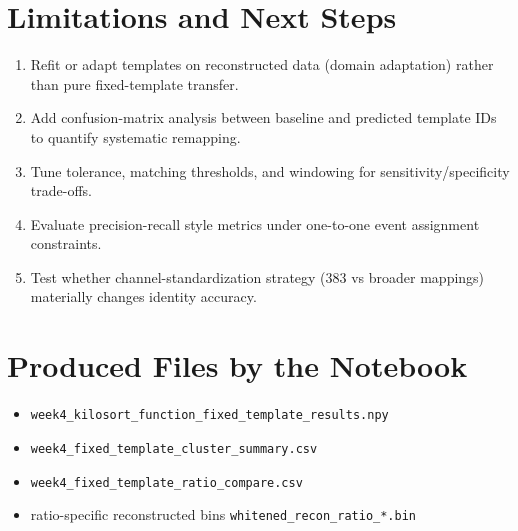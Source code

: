 ﻿\documentclass[11pt]{article}
\begin{document}
\section{Limitations and Next Steps}
\begin{enumerate}
  \item Refit or adapt templates on reconstructed data (domain adaptation) rather than pure fixed-template transfer.
  \item Add confusion-matrix analysis between baseline and predicted template IDs to quantify systematic remapping.
  \item Tune tolerance, matching thresholds, and windowing for sensitivity/specificity trade-offs.
  \item Evaluate precision-recall style metrics under one-to-one event assignment constraints.
  \item Test whether channel-standardization strategy (383 vs broader mappings) materially changes identity accuracy.
\end{enumerate}

\section{Produced Files by the Notebook}
\begin{itemize}
  \item \texttt{week4\_kilosort\_function\_fixed\_template\_results.npy}
  \item \texttt{week4\_fixed\_template\_cluster\_summary.csv}
  \item \texttt{week4\_fixed\_template\_ratio\_compare.csv}
  \item ratio-specific reconstructed bins \texttt{whitened\_recon\_ratio\_*.bin}
\end{itemize}
\end{document}
